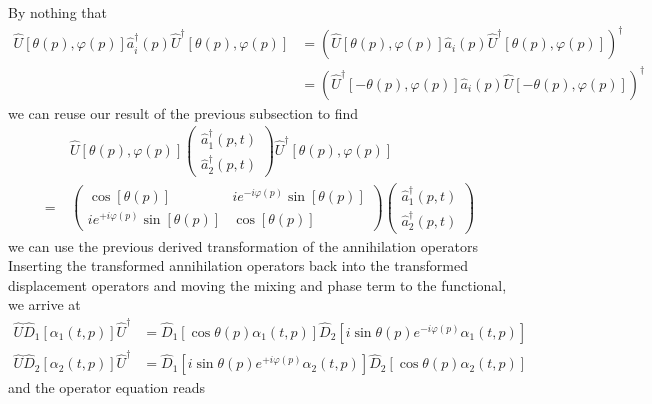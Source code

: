 By nothing that
\begin{equation}
	\begin{split}
		\hat{U}\left[\theta(p),\varphi(p)\right]
		\hat{a}_i^\dagger(p)
		\hat{U}^\dagger\left[\theta(p),\varphi(p)\right]
		&=
		\left(
			\hat{U}\left[\theta(p),\varphi(p)\right]
			\hat{a}_i(p)
			\hat{U}^\dagger\left[\theta(p),\varphi(p)\right]
		\right)^\dagger
		\\
		&=
		\left(
			\hat{U}^\dagger\left[-\theta(p),\varphi(p)\right]
			\hat{a}_i(p)
			\hat{U}\left[-\theta(p),\varphi(p)\right]
		\right)^\dagger
	\end{split}
\end{equation}
we can reuse our result of the previous subsection to find
\begin{equation}
	\begin{split}
		&\
		\hat{U}\left[\theta(p),\varphi(p)\right]
		\begin{pmatrix}
			\hat{a}_1^\dagger(p,t)
			\\
			\hat{a}_2^\dagger(p,t)
		\end{pmatrix}
		\hat{U}^\dagger\left[\theta(p),\varphi(p)\right]
		\\
		=&\
		\begin{pmatrix}
			\cos[\theta(p)] & ie^{-i\varphi(p)}\sin[\theta(p)]
			\\
			ie^{+i\varphi(p)}\sin[\theta(p)] & \cos[\theta(p)]
		\end{pmatrix}
		\begin{pmatrix}
			\hat{a}_1^\dagger(p,t)
			\\
			\hat{a}_2^\dagger(p,t)
		\end{pmatrix}
	\end{split}
\end{equation}
we can use the previous derived transformation of the annihilation operators
Inserting the transformed annihilation operators back into the transformed displacement operators and moving the mixing and phase term to the functional, we arrive at
\begin{align}
	\hat{U}
	\hat{D}_1\left[\alpha_1(t,p)\right]
	\hat{U}^\dagger
	&=
	\hat{D}_1\left[\cos\theta(p)\alpha_1(t,p)\right]
	\hat{D}_2\left[i\sin\theta(p)e^{-i\varphi(p)}\alpha_1(t,p)\right]
	\\
	\hat{U}
	\hat{D}_2\left[\alpha_2(t,p)\right]
	\hat{U}^\dagger
	&=
	\hat{D}_1\left[i\sin\theta(p)e^{+i\varphi(p)}\alpha_2(t,p)\right]
	\hat{D}_2\left[\cos\theta(p)\alpha_2(t,p)\right]
\end{align}
and the operator equation reads

